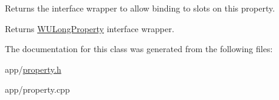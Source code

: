 Returns the interface wrapper to allow binding to slots on this property. 

\begin{DoxyReturn}{Returns}
\hyperlink{class_w_u_long_property}{W\-U\-Long\-Property} interface wrapper. 
\end{DoxyReturn}


The documentation for this class was generated from the following files\-:\begin{DoxyCompactItemize}
\item 
app/\hyperlink{property_8h}{property.\-h}\item 
app/property.\-cpp\end{DoxyCompactItemize}
